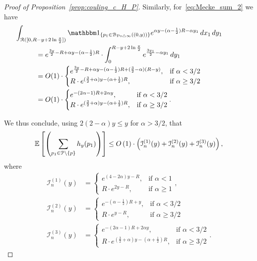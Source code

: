 \begin{proof}[Proof of Proposition~\ref{prop:couling_c_H_P}]
Similarly, for~\eqref{eq:Mecke_sum_2} we have
\begin{align*}
	&\hspace{-30pt}\int_{\Rcal ([0, R - y + 2 \ln \frac{\pi}{2}])} \ind{p_1 \in \BallSym{(0,y)}} e^{\alpha y - (\alpha - \frac{1}{2})R - \alpha y_1} \, dx_1 \, dy_1\\
	&= e^{\frac{3y}{2} - R + \alpha y - (\alpha - \frac{1}{2})R} 
    	\cdot \int_{0}^{R - y + 2 \ln \frac{\pi}{2}} e^{\frac{3y_1}{2}-\alpha y_1} \, dy_1\\
	&= O(1)\cdot 
	\begin{cases} 
	e^{\frac{3y}{2} - R + \alpha y - (\alpha - \frac{1}{2})R + (\frac{3}{2} - \alpha)(R-y)} 
	, & \mbox{if $\alpha < 3/2$} \\ 
	R \cdot e^{(\frac{3}{2} +\alpha)y -  (\alpha + \frac{1}{2})R}, & \mbox{if 
	$\alpha \geq 3/2$}
	\end{cases}	\\
	&= O(1) \cdot 
	\begin{cases}
	  e^{-(2\alpha-1) R + 2 \alpha y}, & \mbox{if $\alpha < 3/2$} \\
	  R \cdot e^{(\frac{3}{2} +\alpha)y -  (\alpha + \frac{1}{2})R}, & \mbox{if 
	$\alpha \geq 3/2$}
	\end{cases}.
\end{align*}

We thus conclude, using $2(2 - \alpha)y \le y$ for $\alpha > 3/2$, that 
\begin{equation} \label{eq:upper_bound_faulty_edges} 
\mathbb{E}\left[\left( \sum_{p_1 \in {\mathcal P} \setminus\{p\}} 
		h_y (p_1)\right)\right] \le O\left(1\right) \cdot 
\left( \mathcal{I}_n^{(1)}(y) + \mathcal{I}_n^{(2)}(y) + \mathcal{I}_n^{(3)}(y) \right),
\end{equation}
where 
\begin{align*}
 \mathcal{I}_n^{(1)}(y) &= \begin{cases}
	e^{(4-2\alpha) y - R}, & \mbox{if $\alpha < 1$} \\
	R \cdot e^{2y - R}, & \mbox{if $\alpha \geq 1$}
	\end{cases},  \\
	\mathcal{I}_n^{(2)}(y) &= 
	\begin{cases}
	e^{-(\alpha - \frac{1}{2})R +y}, & \mbox{if $\alpha < 3/2$} \\
	R \cdot  e^{y - R}, & \mbox{if $\alpha \geq 3/2$}
	\end{cases}\\
	\mathcal{I}_n^{(3)}(y) &= 
\begin{cases}
	  e^{-(2\alpha-1) R + 2 \alpha y}, & \mbox{if $\alpha < 3/2$} \\
	  R \cdot e^{(\frac{3}{2} +\alpha)y -  (\alpha + \frac{1}{2})R}, & \mbox{if 
	$\alpha \geq 3/2$}
	\end{cases}.
\end{align*}


\end{proof}
